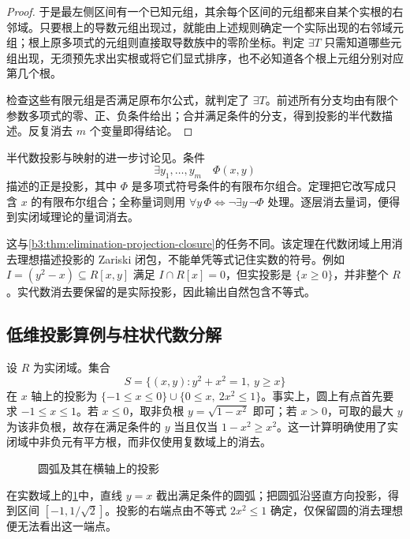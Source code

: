 \begin{proof}
	于是最左侧区间有一个已知元组，其余每个区间的元组都来自某个实根的右邻域。只要根上的导数元组出现过，就能由上述规则确定一个实际出现的右邻域元组；根上原多项式的元组则直接取导数族中的零阶坐标。判定 \(\exists T\) 只需知道哪些元组出现，无须预先求出实根或将它们显式排序，也不必知道各个根上元组分别对应第几个根。

	检查这些有限元组是否满足原布尔公式，就判定了 \(\exists T\)。前述所有分支均由有限个参数多项式的零、正、负条件给出；合并满足条件的分支，得到投影的半代数描述。反复消去 \(m\) 个变量即得结论。
\end{proof}

半代数投影与映射的进一步讨论见\cite[Section 2.2]{BochnakCosteRoy1998RealAG}。条件
\[
	\exists y_1,\ldots,y_m\quad \Phi(x,y)
\]
描述的正是投影，其中 \(\Phi\) 是多项式符号条件的有限布尔组合。定理把它改写成只含 \(x\) 的有限布尔组合；全称量词则用 \(\forall y\,\Phi\iff\neg\exists y\,\neg\Phi\) 处理。逐层消去量词，便得到实闭域理论的量词消去。

\ProseParagraphBreak
这与\cref{b3:thm:elimination-projection-closure}的任务不同。该定理在代数闭域上用消去理想描述投影的 Zariski 闭包，不能单凭等式记住实数的符号。例如 \(I=(y^2-x)\subseteq R[x,y]\) 满足 \(I\cap R[x]=0\)，但实投影是 \(\{x\ge0\}\)，并非整个 \(R\)。实代数消去要保留的是实际投影，因此输出自然包含不等式。

\subsection{低维投影算例与柱状代数分解}
\label{b3:subsec:G01:03}

\begin{example}\label{b3:exm:real-projection-disk}
	设 \(R\) 为实闭域。集合
	\[
		S=\{(x,y):y^2+x^2=1,\ y\ge x\}
	\]
	在 \(x\) 轴上的投影为 \(\{-1\le x\le0\}\cup\{0\le x,\ 2x^2\le1\}\)。事实上，圆上有点首先要求 \(-1\le x\le1\)。若 \(x\le0\)，取非负根 \(y=\sqrt{1-x^2}\) 即可；若 \(x>0\)，可取的最大 \(y\) 为该非负根，故存在满足条件的 \(y\) 当且仅当 \(1-x^2\ge x^2\)。这一计算明确使用了实闭域中非负元有平方根，而非仅使用复数域上的消去。
\end{example}

\begin{figure}[htbp]
	\centering
	
	\caption{圆弧及其在横轴上的投影}
	\label{b3:fig:G-circle-projection}
\end{figure}

在实数域上的\cref{b3:fig:G-circle-projection}中，直线 \(y=x\) 截出满足条件的圆弧；把圆弧沿竖直方向投影，得到区间 \([-1,1/\sqrt2]\)。投影的右端点由不等式 \(2x^2\le1\) 确定，仅保留圆的消去理想便无法看出这一端点。

